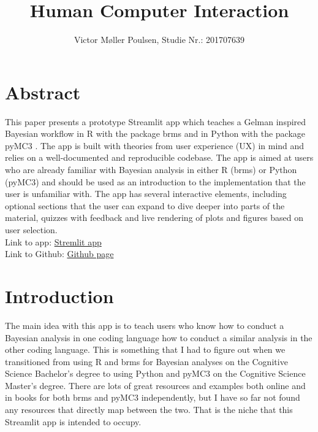 \documentclass[12pt]{article}
\title{Human Computer Interaction}
\author{Victor Møller Poulsen, Studie Nr.: 201707639}
\begin{document}
\maketitle
\leavevmode

\section{Abstract}
This paper presents a prototype Streamlit app which teaches a Gelman
\autocite{gelman2020bayesian} inspired Bayesian workflow
in R with the package brms \autocite{Burkner2017} and in Python with the
package pyMC3 \autocite{Salvatier2016}. The app is built with theories from user
experience (UX) in mind and relies on a well-documented and reproducible codebase. The app is
aimed at users who are already familiar with Bayesian analysis in either R
(brms) or Python (pyMC3) and should be used as an introduction to the
implementation that the user is unfamiliar with. The app has several
interactive elements, including optional sections that the user can expand to
dive deeper into parts of the material, quizzes with feedback and live
rendering of plots and figures based on user selection. \\
Link to app: \href{https://share.streamlit.io/victor-m-p/bayesworkflow/main/BayesWorkflow.py}{Stremlit app}\\
Link to Github: \href{https://github.com/victor-m-p/BayesWorkflow}{Github page}

\section{Introduction}

The main idea with this app is to teach users who know how to conduct a Bayesian analysis in one coding
language how to conduct a similar analysis in the other coding language. This is something
that I had to figure out when we transitioned from using R and brms for Bayesian analyses
on the Cognitive Science Bachelor's degree to using Python and pyMC3 on the Cognitive Science
Master's degree. There are lots of great resources and examples both online and in books for both
brms and pyMC3 independently, but I have so far not found any resources that directly map between
the two. That is the niche that this Streamlit app is intended to occupy.

\vspace{5mm}
\end{document}
